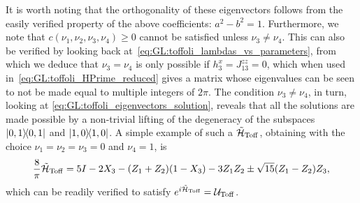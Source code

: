It is worth noting that the orthogonality of these eigenvectors follows from the easily verified property of the above coefficients: $a^2 - b^2 = 1$.
Furthermore, we note that $c(\nu_1, \nu_2, \nu_3, \nu_4) \ge 0$ cannot be satisfied unless $\nu_3 \neq \nu_4$.
This can also be verified by looking back at~\cref{eq:GL:toffoli_lambdas_vs_parameters}, from which we deduce that $\nu_3=\nu_4$ is only possible if $h_3^x=J_{13}^{zz}=0$, which when used in~\cref{eq:GL:toffoli_HPrime_reduced} gives a matrix whose eigenvalues can be seen to not be made equal to multiple integers of $2\pi$.
The condition $\nu_3\neq\nu_4$, in turn, looking at \cref{eq:GL:toffoli_eigenvectors_solution},
reveals that all the solutions are made possible by a non-trivial lifting of the degeneracy of the subspaces $\ketbra{0,1}$ and $\ketbra{1,0}$.
A simple example of such a $\tilde{{\mathcal{H}}}_{\operatorname{Toff}}$, obtaining with the choice $\nu_1=\nu_2=\nu_3=0$ and $\nu_4=1$, is
\begin{equation}
    \frac{8}{\pi}\tilde{{\mathcal{H}}}_{\operatorname{Toff}} =
    5 I - 2 X_3 - (Z_1 + Z_2)(1 - X_3)
    - 3 Z_1 Z_2 \pm \sqrt{15}(Z_1 - Z_2)Z_3,
\end{equation}
which can be readily verified to satisfy $e^{i\tilde{{\mathcal{H}}}_{\operatorname{Toff}}}={\mathcal{U}}_{\operatorname{Toff}}$.

